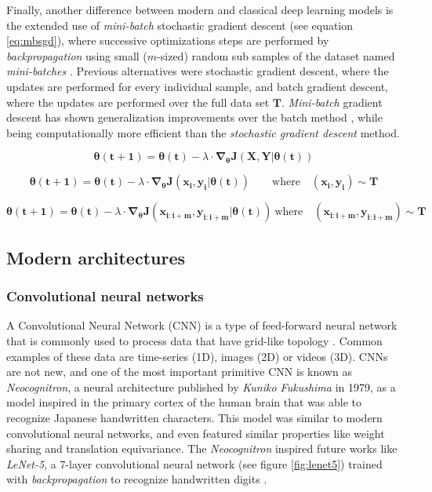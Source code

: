 Finally, another difference between modern and classical deep learning models is the extended use of \textit{mini-batch} stochastic gradient descent (see equation \ref{eq:mbsgd}), where successive optimizations steps are performed by \textit{backpropagation} using small ($m$-sized) random sub samples of the dataset named \textit{mini-batches} \cite{ruder2016}. Previous alternatives were stochastic gradient descent, where the updates are performed for every individual sample, and batch gradient descent, where the updates are performed over the full data set $\mathbf{T}$. \textit{Mini-batch} gradient descent has shown generalization improvements over the batch method \cite{Hoffer2017}, while being computationally more efficient than the \textit{stochastic gradient descent} method.
	

\begin{equation}
	\label{eq:bgd}
	\mathbf{\theta(t+1)} = \mathbf{\theta(t)} - \lambda \cdot \mathbf{\nabla_\theta J(X, Y|\theta(t))}
\end{equation}
	
\begin{equation}
	\label{eq:sgd}
	\mathbf{\theta(t+1)} = \mathbf{\theta(t)} - \lambda \cdot \mathbf{\nabla_\theta J(x_i, y_i|\theta(t))} \quad \mathrm \quad \mathrm{where} \quad (\mathbf{x_i}, \mathbf{y_i}) \sim \mathbf{T}
\end{equation}

\begin{equation}
	\label{eq:mbsgd}
	\mathbf{\theta(t+1)} = \mathbf{\theta(t)} - \lambda \cdot \mathbf{\nabla_\theta J(x_{i:i+m}, y_{i:i+m}|\theta(t))} \  \mathrm{where} \quad  (\mathbf{x_{i:i+m}}, \mathbf{y_{i:i+m}}) \sim \mathbf{T}
\end{equation}


\subsection{Modern architectures}
\subsubsection{Convolutional neural networks}
A Convolutional Neural Network (CNN) is a type of feed-forward neural network that is commonly used to process data that have grid-like topology \cite{Goodfellow2016}. Common examples of these data are time-series (1D), images (2D) or videos (3D). CNNs are not new, and one of the most important primitive CNN is known as \textit{Neocognitron}, a neural architecture published by \textit{Kuniko Fukushima} \cite{fukushima1980} in 1979, as a model inspired in the primary cortex of the human brain that was able to recognize Japanese handwritten characters. This model was similar to modern convolutional neural networks, and even featured similar properties like weight sharing and translation equivariance. The \textit{Neocognitron} inspired future works like \textit{LeNet-5}, a 7-layer convolutional neural network (see figure \ref{fig:lenet5}) trained with \textit{backpropagation} to recognize handwritten digits \cite{lecun1998}. 

